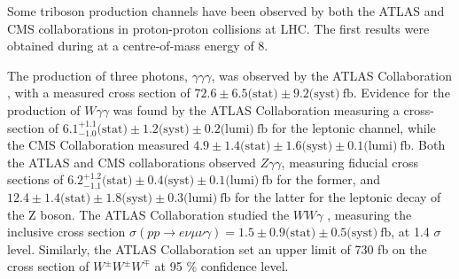 Some triboson production channels have been observed by both the ATLAS and CMS collaborations in proton-proton collisions at LHC.
The first results were obtained during  at a centre-of-mass energy of 8\TeV.

The production of three photons, $\gamma\gamma\gamma$, was observed by the ATLAS Collaboration \cite{STDM-2016-06}, with a measured cross section of $72.6 \pm 6.5 \text{(stat)} \pm 9.2 \text{(syst)}~\text{fb}$.
Evidence for the production of $W\gamma\gamma$ was found by the ATLAS Collaboration \cite{STDM-2013-05} measuring a cross-section of $6.1^{+1.1}_{-1.0} \text{(stat)} \pm 1.2 \text{(syst)} \pm 0.2 \text{(lumi)}~\text{fb}$ for the leptonic channel,
while the CMS Collaboration \cite{SMP-15-008} measured $4.9 \pm 1.4 \text{(stat)} \pm 1.6 \text{(syst)} \pm 0.1 \text{(lumi)}~\text{fb}$.
Both the ATLAS \cite{STDM-2014-01} and CMS collaborations \cite{SMP-15-008} observed $Z\gamma\gamma$, measuring fiducial cross sections of
$6.2^{+1.2}_{-1.1} \text{(stat)} \pm 0.4 \text{(syst)} \pm 0.1 \text{(lumi)}~\text{fb}$ for the former,
and $12.4 \pm 1.4 \text{(stat)} \pm 1.8 \text{(syst)} \pm 0.3 \text{(lumi)}~\text{fb}$ for the latter for the leptonic decay of the Z boson.
The ATLAS Collaboration studied the $WW\gamma$ \cite{STDM-2016-05}, measuring the inclusive cross section $\sigma(pp \rightarrow e\nu \mu\nu \gamma) = 1.5 \pm 0.9 \text{(stat)} \pm 0.5 \text{(syst)}~\text{fb}$, at 1.4 $\sigma$ level.
Similarly, the ATLAS Collaboration set an upper limit of 730 fb \cite{STDM-2015-07} on the cross section of $W^{\pm}W^{\pm}W^{\mp}$ at 95 \% confidence level.

